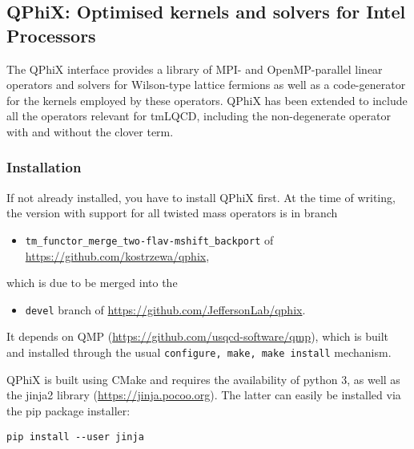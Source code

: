 
\subsection{QPhiX: Optimised kernels and solvers for Intel Processors}\label{subsec:qphix}


The QPhiX \cite{Joo2013} interface provides a library of MPI- and OpenMP-parallel linear operators and solvers for Wilson-type lattice fermions as well as a code-generator for the kernels employed by these operators.
QPhiX has been extended to include all the operators relevant for tmLQCD, including the non-degenerate operator with and without the clover term.

\subsubsection{Installation}
If not already installed, you have to install QPhiX first. At the time of writing, the version with support for all twisted mass operators is in branch 
\begin{itemize}
  \item{\texttt{tm\_functor\_merge\_two-flav-mshift\_backport} of \\ \url{https://github.com/kostrzewa/qphix},}
\end{itemize}
which is due to be merged into the 
\begin{itemize}
\item{\texttt{devel} branch of \url{https://github.com/JeffersonLab/qphix}.}
\end{itemize}

It depends on QMP (\url{https://github.com/usqcd-software/qmp}), which is built and installed through the usual \texttt{configure, make, make install} mechanism.

QPhiX is built using CMake and requires the availability of python 3, as well as the jinja2 library (\url{https://jinja.pocoo.org}).
The latter can easily be installed via the pip package installer:
\begin{framed}
\begin{Verbatim}
pip install --user jinja  
\end{Verbatim}
\end{framed}

